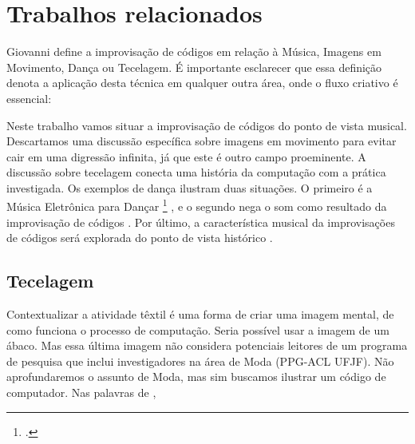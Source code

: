 \chapter{Trabalhos relacionados}\label{cap:introducao}

Giovanni  define a improvisação de códigos em relação à Música, Imagens em Movimento, Dança ou Tecelagem. É importante esclarecer que essa definição denota a aplicação desta técnica em qualquer outra área, onde o fluxo criativo é essencial:

\begin{citacao}
\end{citacao}

Neste trabalho vamos situar a improvisação de códigos do ponto de vista musical. Descartamos uma discussão específica sobre imagens em movimento para evitar cair em uma digressão infinita, já que este é outro campo proeminente. A discussão sobre tecelagem  conecta uma história da computação com a prática investigada. Os exemplos de dança  ilustram duas situações. O primeiro é a Música Eletrônica para Dançar \footnote{.} , e o segundo nega o som como resultado da improvisação de códigos . Por último, a característica musical da improvisações de códigos será explorada do ponto de vista histórico .

\section{Tecelagem}\label{sec:tecelagem}

Contextualizar a atividade têxtil é uma forma de criar uma imagem mental, de como funciona o processo de computação. Seria possível usar a imagem de um ábaco. Mas essa última imagem não considera potenciais leitores de um programa de pesquisa que inclui investigadores na área de Moda (PPG-ACL UFJF). Não aprofundaremos o assunto de Moda, mas sim buscamos ilustrar um código de computador. Nas palavras de ,


